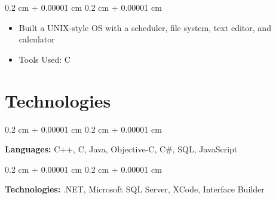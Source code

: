 \documentclass[10pt, letterpaper]{article}
\newenvironment{highlights}{
    \begin{itemize}[
        topsep=0.10 cm,
        parsep=0.10 cm,
        partopsep=0pt,
        itemsep=0pt,
        leftmargin=0.4 cm + 10pt
    ]
}{
    \end{itemize}
} %
\newenvironment{onecolentry}{
    \begin{adjustwidth}{
        0.2 cm + 0.00001 cm
    }{
        0.2 cm + 0.00001 cm
    }
}{
    \end{adjustwidth}
} %
\begin{document}
        \vspace{0.10 cm}
        \begin{onecolentry}
            \begin{highlights}
                \item Built a UNIX-style OS with a scheduler, file system, text editor, and calculator
                \item Tools Used: C
            \end{highlights}
        \end{onecolentry}



    
    \section{Technologies}



        
        \begin{onecolentry}
            \textbf{Languages:} C++, C, Java, Objective-C, C\#, SQL, JavaScript
        \end{onecolentry}

        \vspace{0.2 cm}

        \begin{onecolentry}
            \textbf{Technologies:} .NET, Microsoft SQL Server, XCode, Interface Builder
        \end{onecolentry}


    
\end{document}
